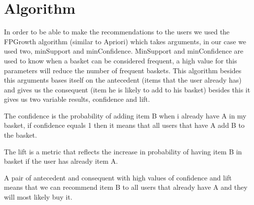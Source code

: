 \section{Algorithm}
\label{algorithm}

In order to be able to make the recommendations to the users we used the FPGrowth algorithm (similar to Apriori) which takes arguments,
in our case we used two, minSupport and minConfidence. MinSupport and minConfidence are used to know when a basket 
can be considered frequent, a high value for this parameters will reduce the number of frequent baskets.
This algorithm besides this arguments bases itself on the antecedent (items that the user already has) and gives us
the consequent (item he is likely to add to his basket) besides this it gives us two variable results, confidence and lift.

The confidence is the probability of adding item B when i already have A in my basket, if confidence equals 1
then it means that all users that have A add B to the basket.

The lift is a metric that reflects the increase in probability of having item B in basket if the user has already
item A.

A pair of antecedent and consequent with high values of confidence and lift means that we can recommend item B to all
users that already have A and they will most likely buy it. 